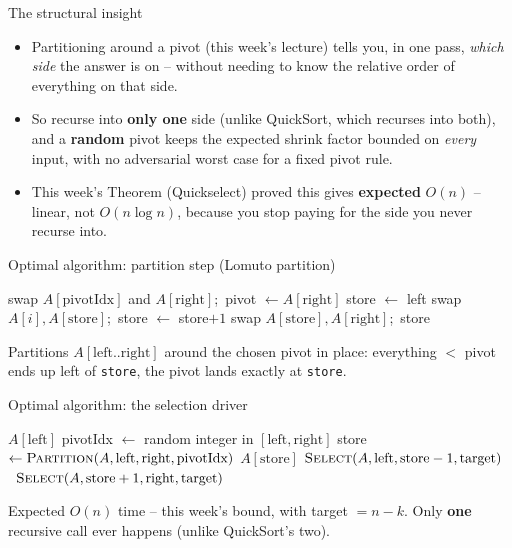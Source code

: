 \documentclass[11pt,aspectratio=169]{beamer}
\begin{document}
\begin{frame}{The structural insight}
  \begin{itemize}
    \item Partitioning around a pivot (this week's lecture) tells you, in one pass,
    \emph{which side} the answer is on -- without needing to know the relative order of
    everything on that side.
    \item So recurse into \textbf{only one} side (unlike QuickSort, which recurses into
    both), and a \textbf{random} pivot keeps the expected shrink factor bounded on
    \emph{every} input, with no adversarial worst case for a fixed pivot rule.
    \item This week's Theorem (Quickselect) proved this gives \textbf{expected}
    $O(n)$ -- linear, not $O(n\log n)$, because you stop paying for the side you never
    recurse into.
  \end{itemize}
\end{frame}

\begin{frame}{Optimal algorithm: partition step (Lomuto partition)}
  \footnotesize
  \begin{algorithmic}[1]
      \State swap $A[\text{pivotIdx}]$ and $A[\text{right}]$;\ pivot $\gets A[\text{right}]$
      \State store $\gets$ left
         swap $A[i], A[\text{store}]$;\ store $\gets$ store$+1$ \EndIf
      \EndFor
      \State swap $A[\text{store}], A[\text{right}]$;\ \Return store
    \EndFunction
  \end{algorithmic}
  Partitions $A[\text{left}..\text{right}]$ around the chosen pivot in place: everything
  $<$ pivot ends up left of \texttt{store}, the pivot lands exactly at \texttt{store}.
\end{frame}

\begin{frame}{Optimal algorithm: the selection driver}
  \footnotesize
  \begin{algorithmic}[1]
       \Return $A[\text{left}]$ \EndIf
      \State pivotIdx $\gets$ random integer in $[\text{left}, \text{right}]$
      \State store $\gets \Call{Partition}{A, \text{left}, \text{right}, \text{pivotIdx}}$
       \Return $A[\text{store}]$
       \Return $\Call{Select}{A,\text{left},\text{store}-1,\text{target}}$
      \Else\ \Return $\Call{Select}{A,\text{store}+1,\text{right},\text{target}}$
      \EndIf
    \EndFunction
  \end{algorithmic}
  Expected $O(n)$ time -- this week's bound, with target $= n-k$. Only \textbf{one}
  recursive call ever happens (unlike QuickSort's two).
\end{frame}
\end{document}
